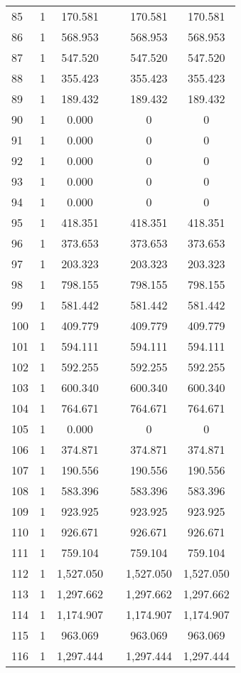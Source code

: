 \begin{table}[!htbp]
\begin{tabular}{@{\extracolsep{5pt}}lccccc}
85 & 1 & 170.581 &  & 170.581 & 170.581 \\ 
86 & 1 & 568.953 &  & 568.953 & 568.953 \\ 
87 & 1 & 547.520 &  & 547.520 & 547.520 \\ 
88 & 1 & 355.423 &  & 355.423 & 355.423 \\ 
89 & 1 & 189.432 &  & 189.432 & 189.432 \\ 
90 & 1 & 0.000 &  & 0 & 0 \\ 
91 & 1 & 0.000 &  & 0 & 0 \\ 
92 & 1 & 0.000 &  & 0 & 0 \\ 
93 & 1 & 0.000 &  & 0 & 0 \\ 
94 & 1 & 0.000 &  & 0 & 0 \\ 
95 & 1 & 418.351 &  & 418.351 & 418.351 \\ 
96 & 1 & 373.653 &  & 373.653 & 373.653 \\ 
97 & 1 & 203.323 &  & 203.323 & 203.323 \\ 
98 & 1 & 798.155 &  & 798.155 & 798.155 \\ 
99 & 1 & 581.442 &  & 581.442 & 581.442 \\ 
100 & 1 & 409.779 &  & 409.779 & 409.779 \\ 
101 & 1 & 594.111 &  & 594.111 & 594.111 \\ 
102 & 1 & 592.255 &  & 592.255 & 592.255 \\ 
103 & 1 & 600.340 &  & 600.340 & 600.340 \\ 
104 & 1 & 764.671 &  & 764.671 & 764.671 \\ 
105 & 1 & 0.000 &  & 0 & 0 \\ 
106 & 1 & 374.871 &  & 374.871 & 374.871 \\ 
107 & 1 & 190.556 &  & 190.556 & 190.556 \\ 
108 & 1 & 583.396 &  & 583.396 & 583.396 \\ 
109 & 1 & 923.925 &  & 923.925 & 923.925 \\ 
110 & 1 & 926.671 &  & 926.671 & 926.671 \\ 
111 & 1 & 759.104 &  & 759.104 & 759.104 \\ 
112 & 1 & 1,527.050 &  & 1,527.050 & 1,527.050 \\ 
113 & 1 & 1,297.662 &  & 1,297.662 & 1,297.662 \\ 
114 & 1 & 1,174.907 &  & 1,174.907 & 1,174.907 \\ 
115 & 1 & 963.069 &  & 963.069 & 963.069 \\ 
116 & 1 & 1,297.444 &  & 1,297.444 & 1,297.444 \\ 

\end{tabular}
\end{table}
